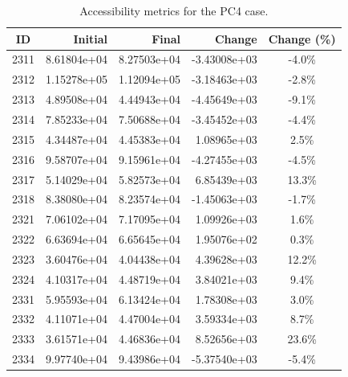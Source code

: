 \begin{table}[h]
    \centering
    \begin{tabular}{|c|r|r|r|c|}
        \hline
        \textbf{ID} & \textbf{Initial} & \textbf{Final} & \textbf{Change} & \textbf{Change (\%)} \\
        \hline
        2311        & 8.61804e+04      & 8.27503e+04    & -3.43008e+03    & -4.0\%               \\
        2312        & 1.15278e+05      & 1.12094e+05    & -3.18463e+03    & -2.8\%               \\
        2313        & 4.89508e+04      & 4.44943e+04    & -4.45649e+03    & -9.1\%               \\
        2314        & 7.85233e+04      & 7.50688e+04    & -3.45452e+03    & -4.4\%               \\
        2315        & 4.34487e+04      & 4.45383e+04    & 1.08965e+03     & 2.5\%                \\
        2316        & 9.58707e+04      & 9.15961e+04    & -4.27455e+03    & -4.5\%               \\
        2317        & 5.14029e+04      & 5.82573e+04    & 6.85439e+03     & 13.3\%               \\
        2318        & 8.38080e+04      & 8.23574e+04    & -1.45063e+03    & -1.7\%               \\
        2321        & 7.06102e+04      & 7.17095e+04    & 1.09926e+03     & 1.6\%                \\
        2322        & 6.63694e+04      & 6.65645e+04    & 1.95076e+02     & 0.3\%                \\
        2323        & 3.60476e+04      & 4.04438e+04    & 4.39628e+03     & 12.2\%               \\
        2324        & 4.10317e+04      & 4.48719e+04    & 3.84021e+03     & 9.4\%                \\
        2331        & 5.95593e+04      & 6.13424e+04    & 1.78308e+03     & 3.0\%                \\
        2332        & 4.11071e+04      & 4.47004e+04    & 3.59334e+03     & 8.7\%                \\
        2333        & 3.61571e+04      & 4.46836e+04    & 8.52656e+03     & 23.6\%               \\
        2334        & 9.97740e+04      & 9.43986e+04    & -5.37540e+03    & -5.4\%               \\
        \hline
    \end{tabular}
    \caption{Accessibility metrics for the PC4 case.}
    \label{tab:pc4_results:app}
\end{table}

